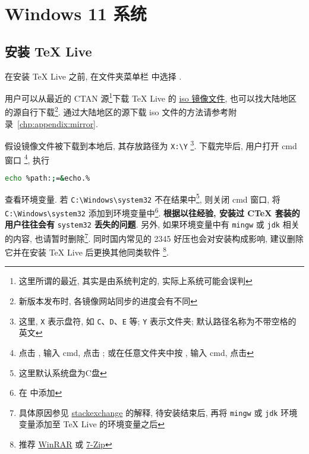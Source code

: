 
\chapter{Windows 11 系统}

\section{安装 \TeX{} Live}\label{sec:windows:install}

在安装 \TeX{} Live 之前,
在文件夹菜单栏  中选择 .

用户可以从最近的 CTAN 源\footnote{这里所谓的最近, 其实是由系统判定的, 实际上系统可能会误判}下载 \TeX{} Live 的
\href{https://mirrors.ctan.org/systems/texlive/Images/texlive2024.iso}{iso 镜像文件},
也可以找大陆地区的源自行下载\footnote{新版本发布时, 各镜像网站同步的进度会有不同}.
通过大陆地区的源下载 iso 文件的方法请参考附录~\ref{chp:appendix:mirror}.

假设镜像文件被下载到本地后,
其存放路径为 \texttt{X:\textbackslash Y}%
\footnote{这里, \texttt{X} 表示盘符,
如 \texttt{C}、\texttt{D}、\texttt{E} 等;
\texttt{Y} 表示文件夹;
默认路径名称为不带空格的英文}.
下载完毕后, 用户打开 \textsf{cmd} 窗口%
\footnote{点击 \keys{\faWindows},
输入 \textsf{cmd},
点击 \keys{\enter};
或在任意文件夹中按 ,
输入 \textsf{cmd},
点击 \keys{\enter}},
执行
\begin{lstlisting}[language = bash]
  echo %path:;=&echo.%
\end{lstlisting}
查看环境变量. 
若 \texttt{C:\textbackslash Windows\textbackslash system32}
不在结果中\footnote{这里默认系统盘为\textsf{C}盘},
则关闭 \textsf{cmd} 窗口,
将 \texttt{C:\textbackslash Windows\textbackslash system32}
添加到环境变量中\footnote{在  中添加}.
\textbf{根据以往经验, 安装过 C\TeX{} 套装的用户往往会有} \texttt{system32} \textbf{丢失的问题}. 
另外, 如果环境变量中有 \texttt{mingw} 或 \texttt{jdk} 相关的内容,
也请暂时删除\footnote{具体原因参见
\href{https://tex.stackexchange.com/questions/445086/error-installing-latest-version-of-tex-live-on-windows-10}{stackexchange} 
的解释, 待安装结束后, 再将 \texttt{mingw} 或 \texttt{jdk} 环境变量添加至 \TeX{} Live 的环境变量之后}.
同时国内常见的 2345 好压也会对安装构成影响,
建议删除它并在安装 \TeX{} Live 后更换其他同类软件%
\footnote{推荐 \href{http://www.winrar.com.cn/}{WinRAR}
或 \href{https://www.7-zip.org/}{7-Zip}}.

